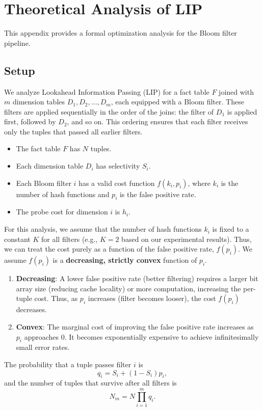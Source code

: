 
\section{Theoretical Analysis of LIP}
This appendix provides a formal optimization analysis for the Bloom filter pipeline.

\subsection{Setup}
We analyze Lookahead Information Passing (LIP) for a fact table $F$ joined with 
$m$ dimension tables $D_1, D_2, \dots, D_m$, each equipped with a Bloom filter.
These filters are applied sequentially in the order of the joins:
the filter of $D_1$ is applied first, followed by $D_2$, and so on.
This ordering ensures that each filter receives only the tuples that passed all earlier filters.

\begin{itemize}
    \item The fact table $F$ has $N$ tuples.
    \item Each dimension table $D_i$ has selectivity $S_i$.
    \item Each Bloom filter $i$ has a valid cost function $f(k_i, p_i)$, where $k_i$ is the number of hash functions and $p_i$ is the false positive rate.
    \item The probe cost for dimension $i$ is $h_i$.
\end{itemize}

For this analysis, we assume that the number of hash functions $k_i$ is fixed to a constant $K$ for all filters (e.g., $K=2$ based on our experimental results). Thus, we can treat the cost purely as a function of the false positive rate, $f(p_i)$.
We assume $f(p_i)$ is a \textbf{decreasing, strictly convex} function of $p_i$.
\begin{enumerate}
    \item \textbf{Decreasing}: A lower false positive rate (better filtering) requires a larger bit array size (reducing cache locality) or more computation, increasing the per-tuple cost. Thus, as $p_i$ increases (filter becomes looser), the cost $f(p_i)$ decreases.
    \item \textbf{Convex}: The marginal cost of improving the false positive rate increases as $p_i$ approaches 0. It becomes exponentially expensive to achieve infinitesimally small error rates.
\end{enumerate}

The probability that a tuple passes filter $i$ is
\[
q_i = S_i + (1 - S_i)p_i,
\]
and the number of tuples that survive after all filters is
\[
N_m = N \prod_{i=1}^{m} q_i.
\]

